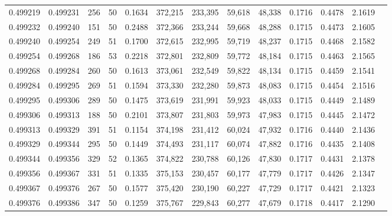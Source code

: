 \begin{tabular}{rrrrrrrrrrrrr}
0.499219 & 0.499231 & 256 &  50 &                                     0.1634 & 372,215 & 233,395 &  59,618 &  48,338 & 0.1716 & 0.4478 & 2.1619 \\
0.499232 & 0.499240 & 151 &  50 &                                     0.2488 & 372,366 & 233,244 &  59,668 &  48,288 & 0.1715 & 0.4473 & 2.1605 \\
0.499240 & 0.499254 & 249 &  51 &                                     0.1700 & 372,615 & 232,995 &  59,719 &  48,237 & 0.1715 & 0.4468 & 2.1582 \\
0.499254 & 0.499268 & 186 &  53 &                                     0.2218 & 372,801 & 232,809 &  59,772 &  48,184 & 0.1715 & 0.4463 & 2.1565 \\
0.499268 & 0.499284 & 260 &  50 &                                     0.1613 & 373,061 & 232,549 &  59,822 &  48,134 & 0.1715 & 0.4459 & 2.1541 \\
0.499284 & 0.499295 & 269 &  51 &                                     0.1594 & 373,330 & 232,280 &  59,873 &  48,083 & 0.1715 & 0.4454 & 2.1516 \\
0.499295 & 0.499306 & 289 &  50 &                                     0.1475 & 373,619 & 231,991 &  59,923 &  48,033 & 0.1715 & 0.4449 & 2.1489 \\
0.499306 & 0.499313 & 188 &  50 &                                     0.2101 & 373,807 & 231,803 &  59,973 &  47,983 & 0.1715 & 0.4445 & 2.1472 \\
0.499313 & 0.499329 & 391 &  51 &                                     0.1154 & 374,198 & 231,412 &  60,024 &  47,932 & 0.1716 & 0.4440 & 2.1436 \\
0.499329 & 0.499344 & 295 &  50 &                                     0.1449 & 374,493 & 231,117 &  60,074 &  47,882 & 0.1716 & 0.4435 & 2.1408 \\
0.499344 & 0.499356 & 329 &  52 &                                     0.1365 & 374,822 & 230,788 &  60,126 &  47,830 & 0.1717 & 0.4431 & 2.1378 \\
0.499356 & 0.499367 & 331 &  51 &                                     0.1335 & 375,153 & 230,457 &  60,177 &  47,779 & 0.1717 & 0.4426 & 2.1347 \\
0.499367 & 0.499376 & 267 &  50 &                                     0.1577 & 375,420 & 230,190 &  60,227 &  47,729 & 0.1717 & 0.4421 & 2.1323 \\
0.499376 & 0.499386 & 347 &  50 &                                     0.1259 & 375,767 & 229,843 &  60,277 &  47,679 & 0.1718 & 0.4417 & 2.1290 \\

\end{tabular}
